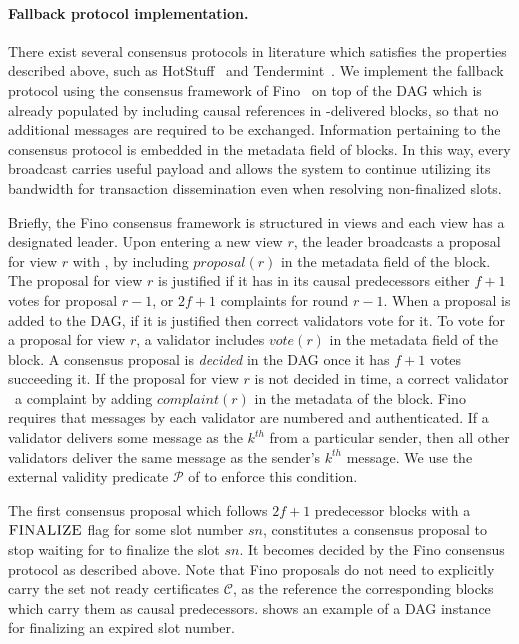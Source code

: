 \paragraph{Fallback protocol implementation.}
There exist several consensus protocols in literature which satisfies the properties described above, such as HotStuff~\cite{yin2019hotstuff} and Tendermint~\cite{buchman2018latest}.
We implement the fallback protocol using the consensus framework of Fino~\cite{fino} on top of the DAG which is already populated by including causal references in \primitivesmall-delivered blocks, so that no additional messages are required to be exchanged.
Information pertaining to the consensus protocol is embedded in the metadata field of blocks.
In this way, every \primitive broadcast carries useful payload and allows the system to continue utilizing its bandwidth for transaction dissemination even when resolving non-finalized slots.

Briefly, the Fino consensus framework is structured in views and each view has a designated leader.
Upon entering a new view $r$, the leader broadcasts a proposal for view $r$ with \primitive, by including $proposal(r)$ in the metadata field of the block.
The proposal for view $r$ is justified if it has in its causal predecessors either $f+1$ votes for proposal $r-1$, or $2f+1$ complaints for round $r-1$.
When a proposal is added to the DAG, if it is justified then correct validators vote for it.
To vote for a proposal for view $r$, a validator includes $vote(r)$ in the metadata field of the block.
A consensus proposal is \emph{decided} in the DAG once it has $f+1$ votes succeeding it.
If the proposal for view $r$ is not decided in time, a correct validator \bbcacast\ a complaint by adding $complaint(r)$ in the metadata of the block.
Fino requires that messages by each validator are numbered and authenticated. If a validator delivers some message as the $k^{th}$ from a particular sender, then all other validators deliver the same message as the sender's $k^{th}$ message.
We use the external validity predicate $\mathcal{P}$ of \primitive to enforce this condition.

The first consensus proposal which follows $2f+1$ predecessor blocks with a $\textsc{FINALIZE}$ flag for some slot number $sn$, constitutes a consensus proposal to stop waiting for \primitive to finalize the slot $sn$.
It becomes decided by the Fino consensus protocol as described above.
Note that Fino proposals do not need to explicitly carry the set not ready certificates $\mathcal{C}$, as the reference the corresponding blocks which carry them as causal predecessors.
 shows an example of a DAG instance for finalizing an expired slot number.


